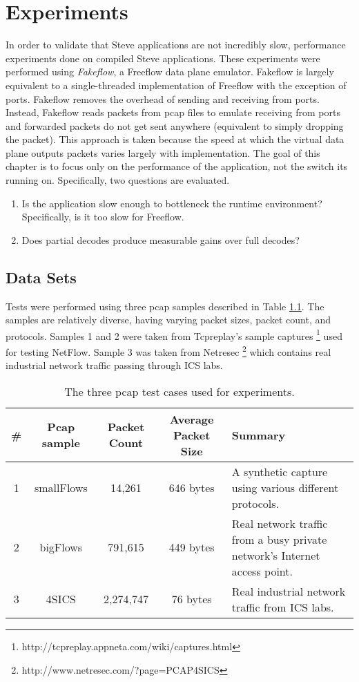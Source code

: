 \chapter{Experiments} \label{ch:experiments}

In order to validate that Steve applications are not incredibly slow, performance experiments done on compiled Steve applications. These experiments were performed using \textit{Fakeflow}, a Freeflow data plane emulator. Fakeflow is largely equivalent to a single-threaded implementation of Freeflow with the exception of ports. Fakeflow removes the overhead of sending and receiving from ports. Instead, Fakeflow reads packets from pcap files to emulate receiving from ports and forwarded packets do not get sent anywhere (equivalent to simply dropping the packet). This approach is taken because the speed at which the virtual data plane outputs packets varies largely with implementation. The goal of this chapter is to focus only on the performance of the application, not the switch its running on. 
Specifically, two questions are evaluated.

\begin{enumerate}
\item Is the application slow enough to bottleneck the runtime environment? Specifically, is it too slow for Freeflow.

\item Does partial decodes produce measurable gains over full decodes?
\end{enumerate}

\section{Data Sets} \label{exp:use_cases}

Tests were performed using three pcap samples described in Table \ref{tbl:pcap}. 
The samples are relatively diverse, having varying packet sizes, packet count, and protocols. Samples 1 and 2 were taken from Tcpreplay's sample captures \footnote{http://tcpreplay.appneta.com/wiki/captures.html} used for testing NetFlow. Sample 3 was taken from Netresec \footnote{http://www.netresec.com/?page=PCAP4SICS} which contains real industrial network traffic passing through ICS labs.

\begin{table}
\caption{The three pcap test cases used for experiments.}
\begin{center}
\begin{tabularx}{\linewidth}{| c || c | c | c | X |}
\hline
\# & Pcap sample & Packet Count & Average Packet Size & Summary \\
\hline
1 & smallFlows & 14,261 & 646 bytes & A synthetic capture using various different protocols. \\
\hline
2 & bigFlows & 791,615 & 449 bytes & Real network traffic from a busy private network's Internet access point. \\
\hline
3 & 4SICS & 2,274,747 & 76 bytes & Real industrial network traffic from ICS labs. \\
\hline
\end{tabularx}
\end{center}
\label{tbl:pcap}
\end{table}


